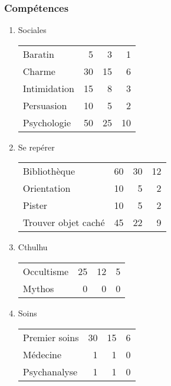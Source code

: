 \documentclass[11pt]{article}
\begin{document}
\begin{twocols}
\subsubsection{Compétences}
\label{sec:org9bd0b6b}
\begin{enumerate}
\item Sociales
\label{sec:org5f1c1a8}

\begin{center}
\begin{tabular}{lrrr}
Baratin & 5 & 3 & 1\\
Charme & 30 & 15 & 6\\
Intimidation & 15 & 8 & 3\\
Persuasion & 10 & 5 & 2\\
Psychologie & 50 & 25 & 10\\
\end{tabular}
\end{center}

\item Se repérer
\label{sec:org10b7f5d}

\begin{center}
\begin{tabular}{lrrr}
Bibliothèque & 60 & 30 & 12\\
Orientation & 10 & 5 & 2\\
Pister & 10 & 5 & 2\\
Trouver objet caché & 45 & 22 & 9\\
\end{tabular}
\end{center}

\item Cthulhu
\label{sec:orgf4a45a8}

\begin{center}
\begin{tabular}{lrrr}
Occultisme & 25 & 12 & 5\\
Mythos & 0 & 0 & 0\\
\end{tabular}
\end{center}

\item Soins
\label{sec:org709ab44}

\begin{center}
\begin{tabular}{lrrr}
Premier soins & 30 & 15 & 6\\
Médecine & 1 & 1 & 0\\
Psychanalyse & 1 & 1 & 0\\
\end{tabular}
\end{center}


\end{enumerate}
\end{twocols}
\end{document}
